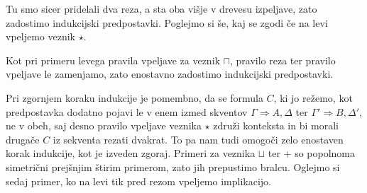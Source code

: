 Tu smo sicer pridelali dva reza, a sta oba višje v drevesu izpeljave, zato zadostimo indukcijski predpostavki. Poglejmo si še, kaj se zgodi če na levi vpeljemo veznik $\star$.
\begin{prooftree}

\end{prooftree}
\dol
\begin{prooftree}

\end{prooftree}
Kot pri primeru levega pravila vpeljave za veznik $\sqcap$, pravilo reza ter pravilo vpeljave le zamenjamo, zato enostavno zadostimo indukcijski predpostavki.
\begin{prooftree}

\end{prooftree}
\dol
\begin{prooftree}

\end{prooftree}
Pri zgornjem koraku indukcije je pomembno, da se formula $C$, ki jo režemo, kot predpostavka dodatno pojavi le v enem izmed skventov $\Gamma \Rightarrow A,\Delta$ ter $\Gamma' \Rightarrow B,\Delta'$, ne v obeh, saj desno pravilo vpeljave veznika $\star$ združi konteksta in bi morali drugače $C$ iz sekventa rezati dvakrat. To pa nam tudi omogoči zelo enostaven korak indukcije, kot je izveden zgoraj. Primeri za veznika $\sqcup$ ter + so popolnoma simetrični prejšnjim štirim primerom, zato jih prepustimo bralcu. Oglejmo si sedaj primer, ko na levi tik pred rezom vpeljemo implikacijo.
